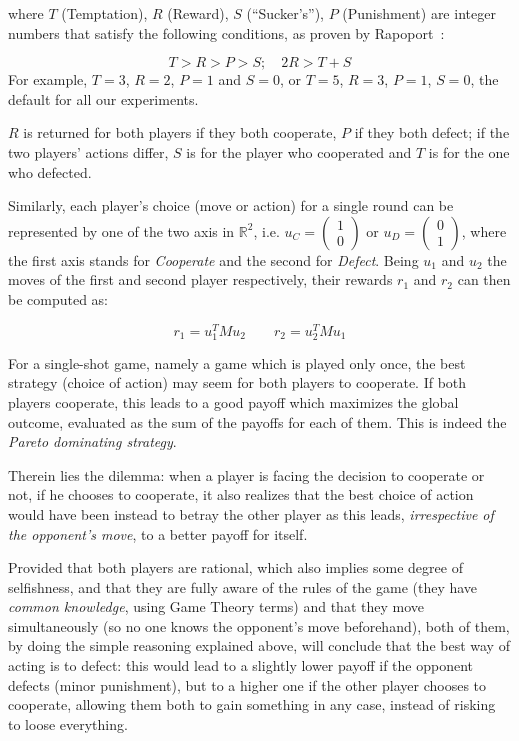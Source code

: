 \documentclass[journal,10pt,twoside]{IEEEtran}
\begin{document}
where $T$ (Temptation), $R$ (Reward), $S$ (``Sucker's''), $P$ (Punishment) are integer numbers that satisfy the following conditions, as proven by Rapoport~\cite{rapoport}:

$$
T>R>P>S; \quad 2R > T+S 
$$
For example, $T=3$, $R=2$, $P=1$ and $S=0$, or  $T=5$, $R=3$, $P=1$, $S=0$, the default for all our experiments.

$R$ is returned for both players if they both cooperate, $P$ if they both defect; if the two players' actions differ, $S$ is for the player who cooperated and $T$ is for the one who defected.

Similarly, each player's choice (move or action) for a single round can be represented by one of the two axis in $\mathbb{R}^2$, i.e. $u_C=\begin{pmatrix} 1 \\ 0 \end{pmatrix}$ or $u_D=\begin{pmatrix} 0 \\ 1 \end{pmatrix}$, where the first axis stands for \textit{Cooperate} and the second for \textit{Defect}. Being $u_1$ and $u_2$ the moves of the first and second player respectively, their rewards $r_1$ and $r_2$ can then be computed as:

$$
r_1 = u_1^T M u_2
\quad
\quad
r_2 = u_2^T M u_1
$$

For a single-shot game, namely a game which is played only once, the best strategy (choice of action) may seem for both players to cooperate. If both players cooperate, this leads to a good payoff which maximizes the global outcome, evaluated as the sum of the payoffs for each of them. This is indeed the \textit{Pareto dominating strategy}.

Therein lies the dilemma: when a player is facing the decision to cooperate or not, if he chooses to cooperate, it also realizes that the best choice of action would have been instead to betray the other player as this leads, \textit{irrespective of the opponent's move}, to a better payoff for itself.

Provided that both players are rational, which also implies some degree of selfishness, and that they are fully aware of the rules of the game (they have \textit{common knowledge}, using Game Theory terms) and that they move simultaneously (so no one knows the opponent's move beforehand), both of them, by doing the simple reasoning explained above, will conclude that the best way of acting is to defect: this would lead to a slightly lower payoff if the opponent defects (minor punishment), but to a higher one if the other player chooses to cooperate, allowing them both to gain something in any case, instead of risking to loose everything.
\end{document}
